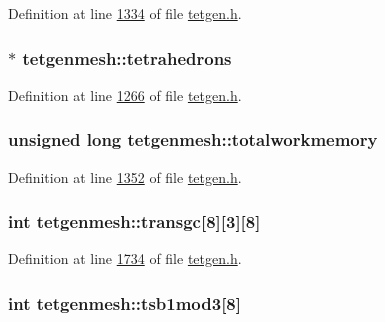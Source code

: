 Definition at line \hyperlink{tetgen_8h_source_l01334}{1334} of file \hyperlink{tetgen_8h_source}{tetgen.\+h}.

\subsubsection[{\texorpdfstring{tetrahedrons}{tetrahedrons}}]{$\ast$ tetgenmesh\+::tetrahedrons}\hypertarget{classtetgenmesh_ae2ecb721778b73b3b10163e3069247a6}{}\label{classtetgenmesh_ae2ecb721778b73b3b10163e3069247a6}


Definition at line \hyperlink{tetgen_8h_source_l01266}{1266} of file \hyperlink{tetgen_8h_source}{tetgen.\+h}.

\subsubsection[{\texorpdfstring{totalworkmemory}{totalworkmemory}}]{\setlength{\rightskip}{0pt plus 5cm}unsigned long tetgenmesh\+::totalworkmemory}\hypertarget{classtetgenmesh_a67341ca5f2c0ece12052d62316f99363}{}\label{classtetgenmesh_a67341ca5f2c0ece12052d62316f99363}


Definition at line \hyperlink{tetgen_8h_source_l01352}{1352} of file \hyperlink{tetgen_8h_source}{tetgen.\+h}.

\subsubsection[{\texorpdfstring{transgc}{transgc}}]{\setlength{\rightskip}{0pt plus 5cm}int tetgenmesh\+::transgc\mbox{[}8\mbox{]}\mbox{[}3\mbox{]}\mbox{[}8\mbox{]}}\hypertarget{classtetgenmesh_a606af36503a05864a66eed7887031f92}{}\label{classtetgenmesh_a606af36503a05864a66eed7887031f92}


Definition at line \hyperlink{tetgen_8h_source_l01734}{1734} of file \hyperlink{tetgen_8h_source}{tetgen.\+h}.

\subsubsection[{\texorpdfstring{tsb1mod3}{tsb1mod3}}]{\setlength{\rightskip}{0pt plus 5cm}int tetgenmesh\+::tsb1mod3\mbox{[}8\mbox{]}}\hypertarget{classtetgenmesh_abcdcec3f841610fe91a0160b4e3a838e}{}\label{classtetgenmesh_abcdcec3f841610fe91a0160b4e3a838e}


